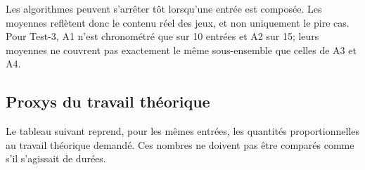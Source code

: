 \documentclass[11pt,a4paper]{article}
\begin{document}
\begin{table}[H]
\centering
\scriptsize
{}
\caption{Temps moyens par entrée pour les cinq jeux de données. Le nombre entre parenthèses indique les entrées mesurées sur le total.}
\label{tab:jeux}
\end{table}

Les algorithmes peuvent s'arrêter tôt lorsqu'une entrée est composée. Les moyennes reflètent donc le contenu réel des jeux, et non uniquement le pire cas. Pour Test-3, A1 n'est chronométré que sur 10 entrées et A2 sur 15; leurs moyennes ne couvrent pas exactement le même sous-ensemble que celles de A3 et A4.

\subsection{Proxys du travail théorique}

Le tableau suivant reprend, pour les mêmes entrées, les quantités proportionnelles au travail théorique demandé. Ces nombres ne doivent pas être comparés comme s'il s'agissait de durées.
\end{document}
